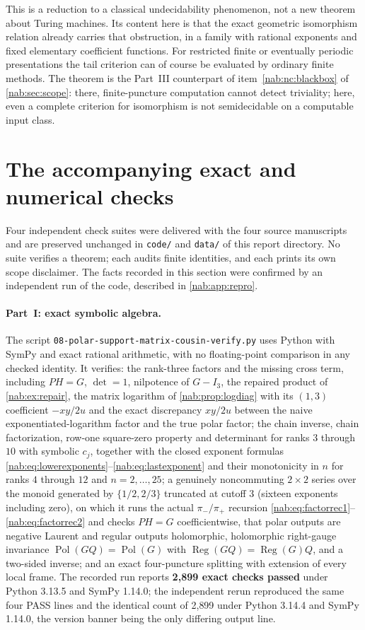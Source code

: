 \documentclass[11pt,letterpaper]{article}
\theoremstyle{definition}
\theoremstyle{remark}
\newcommand{\Pol}{\operatorname{Pol}}
\newcommand{\Reg}{\operatorname{Reg}}
\numberwithin{equation}{section}
\begin{document}
This is a reduction to a classical undecidability phenomenon, not a new theorem
about Turing machines. Its content here is that the exact geometric isomorphism
relation already carries that obstruction, in a family with rational exponents
and fixed elementary coefficient functions. For restricted finite or eventually
periodic presentations the tail criterion can of course be evaluated by
ordinary finite methods. The theorem is the Part~III counterpart of
item~\ref{nab:nc:blackbox} of \cref{nab:sec:scope}: there, finite-puncture
computation cannot detect triviality; here, even a complete criterion for
isomorphism is not semidecidable on a computable input class.

\section{The accompanying exact and numerical checks}
\label{nab:sec:verification}

Four independent check suites were delivered with the four source
manuscripts and are preserved unchanged in \texttt{code/} and \texttt{data/} of
this report directory. No suite verifies a theorem; each audits finite
identities, and each prints its own scope disclaimer. The facts recorded in this section were
confirmed by an independent run of the code, described in
\cref{nab:app:repro}.

\paragraph{Part~I: exact symbolic algebra.}
The script \texttt{08-polar-support-matrix-cousin-verify.py} uses Python with
SymPy and exact rational arithmetic, with no floating-point comparison in any
checked identity. It verifies: the rank-three factors and the missing cross
term, including $P H=G$, $\det=1$, nilpotence of $G-I_3$, the repaired product
of \cref{nab:ex:repair}, the matrix logarithm of \cref{nab:prop:logdiag} with
its $(1,3)$ coefficient $-xy/2u$ and the exact discrepancy $xy/2u$ between the
naive exponentiated-logarithm factor and the true polar factor; the chain
inverse, chain factorization, row-one square-zero property and determinant for
ranks $3$ through $10$ with symbolic $c_j$, together with the closed exponent
formulas \eqref{nab:eq:lowerexponents}--\eqref{nab:eq:lastexponent} and their
monotonicity in $n$ for ranks $4$ through $12$ and $n=2,\ldots,25$; a genuinely
noncommuting $2\times2$ series over the monoid generated by $\{1/2,2/3\}$
truncated at cutoff $3$ (sixteen exponents including zero), on which it runs
the actual $\pi_-/\pi_+$ recursion
\eqref{nab:eq:factorrec1}--\eqref{nab:eq:factorrec2} and checks $PH=G$
coefficientwise, that polar outputs are negative Laurent and regular outputs
holomorphic, holomorphic right-gauge invariance
$\Pol(GQ)=\Pol(G)$ with $\Reg(GQ)=\Reg(G)Q$, and a two-sided inverse; and an
exact four-puncture splitting with extension of every local frame. The
recorded run reports \textbf{2{,}899 exact checks passed} under Python 3.13.5
and SymPy 1.14.0; the independent rerun reproduced the same four PASS lines and
the identical count of 2{,}899 under Python 3.14.4 and SymPy 1.14.0, the
version banner being the only differing output line.
\end{document}
